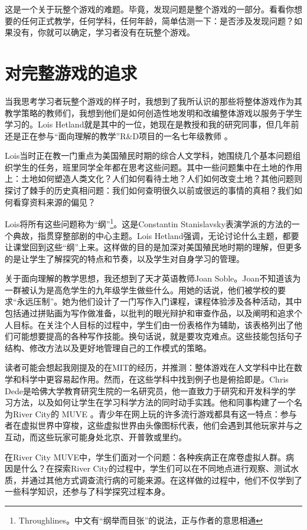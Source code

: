这是一个关于玩整个游戏的难题。毕竟，发现问题是整个游戏的一部分。看看你想要的任何正式教学，任何学科，任何年龄，简单估测一下：是否涉及发现问题？如果没有，你就可以确定，学习者没有在玩整个游戏。

\section*{对完整游戏的追求}

当我思考学习者玩整个游戏的样子时，我想到了我所认识的那些将整体游戏作为其教学策略的教师们，我想到他们是如何创造性地发明和改编整体游戏以服务于学生学习的。Lois Hetland就是其中的一位，她现在是教授和我的研究同事，但几年前还是正在参与“面向理解的教学”R\&D项目的一名七年级教师 。

Lois当时正在教一门重点为美国殖民时期的综合人文学科，她围绕几个基本问题组织学生的任务，班里同学全年都在思考这些问题。其中一些问题集中在土地的作用上：土地如何塑造人类文化？人们如何看待土地？人们如何改变土地？其他问题则探讨了棘手的历史真相问题：我们如何查明很久以前或很远的事情的真相？我们如何看穿资料来源的偏见？

Lois将所有这些问题称为“纲”\footnote{Throughlines。中文有“纲举而目张”的说法，正与作者的意思相通}。这是Constantin Stanislavsky表演学派的方法的一个典故，指贯穿整部剧的中心主题。Lois Hetland强调，无论讨论什么主题，都要让课堂回到这些“纲”上来。这样做的目的是加深对美国殖民地时期的理解，但更多的是让学生了解探究的特点和节奏，以及学生对自身学习的管理。

关于面向理解的教学思想，我还想到了天才英语教师Joan Soble。Joan不知道该为一群被认为是高危学生的九年级学生做些什么。用她的话说，他们被学校的要求“永远压制”。她为他们设计了一门写作入门课程，课程体验涉及各种活动，其中包括通过拼贴画为写作做准备，以批判的眼光辩护和审查作品，以及阐明和追求个人目标。在关注个人目标的过程中，学生们由一份表格作为辅助，该表格列出了他们可能想要提高的各种写作技能。换句话说，就是要攻克难点。这些技能包括句子结构、修改方法以及更好地管理自己的工作模式的策略。

读者可能会想起我刚提及的在MIT的经历，并推测：整体游戏在人文学科中比在数学和科学中更容易起作用。然而，在这些学科中找到例子也是俯拾即是。Chris Dede是哈佛大学教育研究生院的一名研究员，他一直致力于研究和开发科学的学习方法，以及如何让学生在学习科学方法的同时动手实践。他和同事构建了一个名为River City的 MUVE 。青少年在网上玩的许多流行游戏都具有这一特点：参与者在虚拟世界中穿梭，这些虚拟世界由头像图标代表，他们会遇到其他玩家并与之互动，而这些玩家可能身处北京、开普敦或里约。

在River City MUVE中，学生们面对一个问题：各种疾病正在席卷虚拟人群。病因是什么？在探索River City的过程中，学生们可以在不同地点进行观察、测试水质，并通过其他方式调查流行病的可能来源。在这样做的过程中，他们不仅学到了一些科学知识，还参与了科学探究过程本身。

